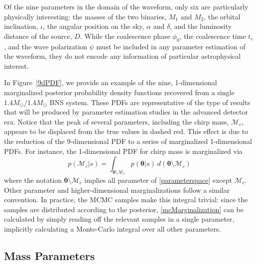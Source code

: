 \documentclass[11pt,a4paper]{emulateapj} 
\newcommand{\will}[1]{{\color{cyan} #1}}
\newcommand{\thpara}{\boldsymbol{\theta}}
\newcommand{\chmass}{\mathcal{M}_c}
\begin{document}
Of the nine parameters in the domain of the waveform, only six are
particularly physically interesting: the masses of the two binaries,
$M_1$ and $M_2$, the orbital inclination, $\iota$, the angular
position on the sky, $\alpha$ and $\delta$, and the luminosity
distance of the source, $D$.  While the coalescence phase $\phi_0$,
the coalescence time $t_c$, and the wave polarization $\psi$ must be
included in any parameter estimation of the waveform, they do not
encode any information of particular astrophysical
interest.%

In Figure~\ref{9dPDF}, we provide an example of the nine,
1-dimensional marginalized posterior probability density functions
recovered from a single $1.4M_{\odot}/1.4M_{\odot}$ BNS system.  These
PDFs are representative of the type of results that will be produced by
parameter estimation studies in the advanced detector era.  Notice
that the peak of several parameters, including the chirp mass,
$\chmass$, appears to be displaced from the true values in dashed red.  This
effect is due to the reduction of the 9-dimensional PDF to a series of
marginalized 1-dimensional PDFs.  For instance, the 1-dimensional PDF
for chirp mass is marginalized via
\begin{equation}
p(\chmass | s) = \int _{\thpara \setminus \chmass} p(\thpara |
s)~d(\thpara \setminus \chmass)
\label{mcMarginalization}
\end{equation}
where the notation $\thpara \setminus \chmass$ implies all parameter
of \eqref{parameterspace} except $\chmass$.  Other parameter and
higher-dimensional marginalizations follow a similar convention.  In
practice, the MCMC samples make this integral trivial: since the
samples are distributed according to the posterior,
\eqref{mcMarginalization} can be calculated by simply reading off the
relevant samples in a single parameter, implicitly calculating a
Monte-Carlo integral over all other parameters.



\subsection{Mass Parameters}
\label{massSection}
\end{document}
